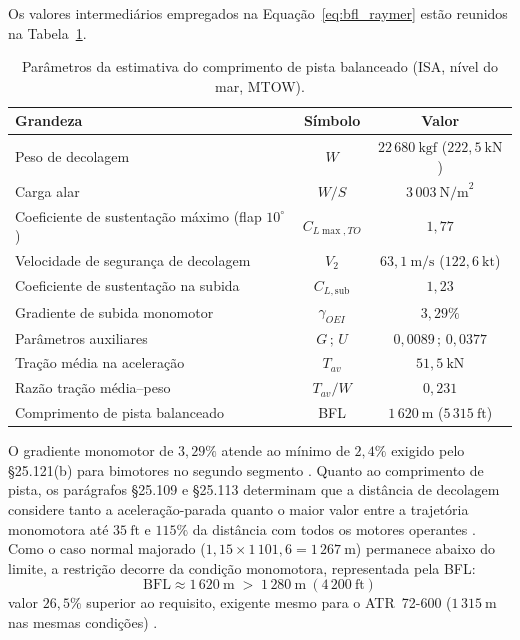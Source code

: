 Os valores intermediários empregados na Equação~\ref{eq:bfl_raymer} estão reunidos na Tabela~\ref{tab:parametros_bfl}.

\begin{table}[H]
    \centering
    \caption{Parâmetros da estimativa do comprimento de pista balanceado (ISA, nível do mar, MTOW).}
    \label{tab:parametros_bfl}
    \begin{tabular}{l c c}
    \toprule
        Grandeza & Símbolo & Valor \\
    \midrule
        Peso de decolagem & $W$ & $22\,680~\text{kgf}$ ($222{,}5~\text{kN}$) \\
        Carga alar & $W/S$ & $3\,003~\text{N/m}^2$ \\
        Coeficiente de sustentação máximo (flap $10^\circ$) & $C_{L\max,TO}$ & $1{,}77$ \\
        Velocidade de segurança de decolagem & $V_2$ & $63{,}1~\text{m/s}$ ($122{,}6~\text{kt}$) \\
        Coeficiente de sustentação na subida & $C_{L,\text{sub}}$ & $1{,}23$ \\
        Gradiente de subida monomotor & $\gamma_{OEI}$ & $3{,}29\%$ \\
        Parâmetros auxiliares & $G\,;\,U$ & $0{,}0089\,;\,0{,}0377$ \\
        Tração média na aceleração & $T_{av}$ & $51{,}5~\text{kN}$ \\
        Razão tração média--peso & $T_{av}/W$ & $0{,}231$ \\
    \midrule
        Comprimento de pista balanceado & BFL & $1\,620~\text{m}$ ($5\,315~\text{ft}$) \\
    \bottomrule
    \end{tabular}
\end{table}

O gradiente monomotor de $3{,}29\%$ atende ao mínimo de $2{,}4\%$ exigido pelo \S25.121(b) para bimotores no segundo segmento \cite{far25}. Quanto ao comprimento de pista, os parágrafos \S25.109 e \S25.113 determinam que a distância de decolagem considere tanto a aceleração-parada quanto o maior valor entre a trajetória monomotora até $35~\mathrm{ft}$ e $115\%$ da distância com todos os motores operantes \cite{far25}. Como o caso normal majorado ($1{,}15 \times 1\,101{,}6 = 1\,267~\mathrm{m}$) permanece abaixo do limite, a restrição decorre da condição monomotora, representada pela BFL:
\begin{equation}
    \mathrm{BFL} \approx 1\,620~\mathrm{m} \;>\; 1\,280~\mathrm{m}~(4\,200~\mathrm{ft})
\end{equation}
valor $26{,}5\%$ superior ao requisito, exigente mesmo para o ATR~72-600 ($1\,315~\mathrm{m}$ nas mesmas condições) \cite{atr72600}.

